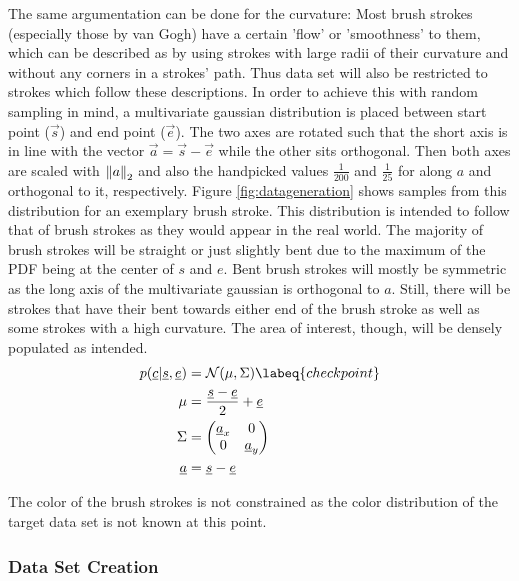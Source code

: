 The same argumentation can be done for the curvature:
Most brush strokes (especially those by van Gogh) have a certain 'flow' or 'smoothness'
to them, which can be described as by using strokes with large radii of their curvature
and without any corners in a strokes' path.
Thus data set will also be restricted to strokes which follow these descriptions.
In order to achieve this with random sampling in mind, a multivariate gaussian distribution
is placed between start point ($\vec{s}$) and end point ($\vec{e}$).
The two axes are rotated such that the short axis is in line with the vector
$\vec{a} = \vec{s} - \vec{e}$ while the other sits orthogonal.
Then both axes are scaled with $\left\lVert a\right\rVert_2$ and also the handpicked values $\frac{1}{200}$
and $\frac{1}{25}$ for along $a$ and orthogonal to it, respectively.
Figure \ref{fig:datageneration} shows samples from this distribution for an exemplary
brush stroke.
This distribution is intended to follow that of brush strokes as they would appear
in the real world.
The majority of brush strokes will be straight or just slightly bent due to the maximum
of the PDF being at the center of $s$ and $e$.
Bent brush strokes will mostly be symmetric as the long axis of the multivariate gaussian
is orthogonal to $a$.
Still, there will be strokes that have their bent towards either end of the brush stroke
as well as some strokes with a high curvature.
The area of interest, though, will be densely populated as intended.
\begin{align}
    p(\vec{c}| \vec{s}, \vec{e}) & = \mathcal{N}(\mu, \Sigma) \labeq{checkpoint} \\
    \mu & = \frac{\vec{s} - \vec{e}}{2} + \vec{e} \\
    \Sigma & =
        \begin{pmatrix}
            \vec{a}_x & 0 \\
            0 & \vec{a}_y
        \end{pmatrix} \\
    \vec{a} & = \vec{s} - \vec{e}
\end{align}

The color of the brush strokes is not constrained as the color distribution of the
target data set is not known at this point. 



\subsubsection{Data Set Creation}

